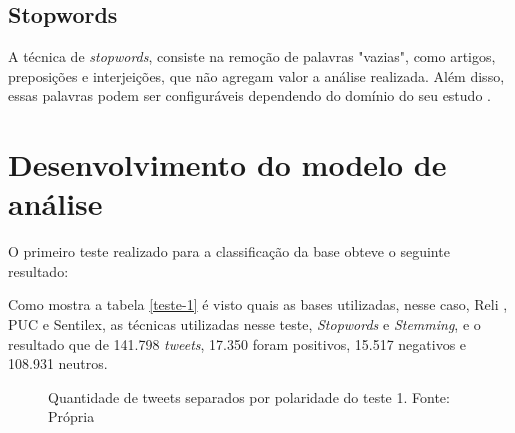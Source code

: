 \subsection{Stopwords}
A técnica de \textit{stopwords}, consiste na remoção de palavras "vazias", como artigos, preposições e interjeições, que não agregam valor a análise realizada. Além disso, essas palavras podem ser configuráveis dependendo do domínio do seu estudo  \cite{Rajaraman_Ullman_2011}.

\section{Desenvolvimento do modelo de análise}\label{sec:desenv-moda}
O primeiro teste realizado para a classificação da base obteve o seguinte resultado:
\begin{table}[]
	\caption{1º teste}
	\label{teste-1}
\end{table}

Como mostra a tabela \ref{teste-1} é visto quais as bases utilizadas, nesse caso, Reli , PUC e Sentilex, as técnicas utilizadas nesse teste, \textit{Stopwords} e \textit{Stemming}, e o resultado que de 141.798 \textit{tweets}, 17.350 foram positivos, 15.517 negativos e 108.931 neutros.
\begin{figure}[!h]
	\centering{}
	\caption{Quantidade de tweets separados por polaridade do teste 1. Fonte: Própria}
	\label{teste-graf-1}
\end{figure}

